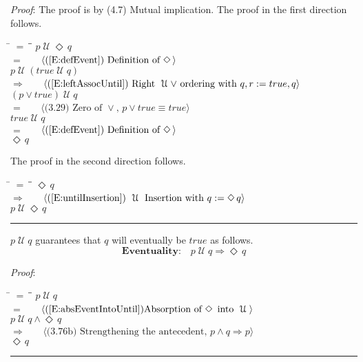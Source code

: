 \documentclass[12pt, fleqn, leqno]{article}
\newcommand{\lgap}{2pt}                             %
\newcommand{\mymathindent}{24pt}                    %
\newcommand{\impl}{\ensuremath{\Rightarrow}}        %
\newcommand{\Until}{\;\mathcal{U}\;}
\newcommand{\Event}{\Diamond\,}
\newcommand{\myqed}{\rule[-.23ex]{1.2ex}{2.0ex}}
\newcommand{\myqedtab}{\hspace{384pt}}              %
\newcommand{\Gll} {\langle}                         %
\newcommand{\Ggg} {\rangle}                         %
\newcommand{\Hint}[1]     {\ \ \ $\Gll              \mbox{#1} \Ggg$ }   %
\begin{document}
\emph{Proof}: The proof is by (4.7) Mutual implication.
The proof in the first direction follows.
\begin{tabbing}
\hspace{\mymathindent} \= $= \;$ \= \myqedtab \= \kill
\> \> $p \Until \Event q$\\[\lgap]
\> $=$ \> \Hint{(\ref{E:defEvent}) Definition of $\Event$} \\[\lgap]
\>\> $p \Until (true \Until q)$\\[\lgap]
\> $\impl$ \> \Hint{(\ref{E:leftAssocUntil})  Right $\Until \lor$ ordering with $q,r := true,q$} \\[\lgap]
\> \> $(p \lor true) \Until q$\\[\lgap]
\> $=$ \> \Hint{(3.29) Zero of $\lor$, $p\lor true\equiv true$} \\[\lgap]
\> \> $true \Until q$\\[\lgap]
\> $=$ \> \Hint{(\ref{E:defEvent}) Definition of $\Event$} \\[\lgap]
\> \> $\Event q$

\end{tabbing}
The proof in the second direction follows.
\begin{tabbing}
\hspace{\mymathindent} \= $= \;$ \= \myqedtab \= \kill
\> \> $ \Event q$\\[\lgap]
\> $\impl$ \> \Hint{(\ref{E:untilInsertion}) $\Until$ Insertion with $q := \Event q$} \\[\lgap]
\> \> $p \Until \Event q$ \quad \myqed
\end{tabbing}

$p\Until q$ guarantees that $q$ will eventually be $true$ as follows.
\begin{equation}\label{E:eventuality}
\textbf{Eventuality:}\quad p \Until q \impl \Event q
\end{equation}

\emph{Proof}:
\begin{tabbing}
\hspace{\mymathindent} \= $= \;$ \= \myqedtab \= \kill
  \> \>   $p \Until q$\\[\lgap]
  \> $=$  \>  \Hint{(\ref{E:absEventIntoUntil})Absorption of $\Event$ into $\Until$}\\[\lgap]
  \> \>   $p \Until q \land \Event q$\\[\lgap]
  \> $\impl$  \>  \Hint{(3.76b) Strengthening the antecedent, $p\land q \impl p$}\\[\lgap]
  \> \>   $\Event q$ \quad \myqed
\end{tabbing}
\end{document}
